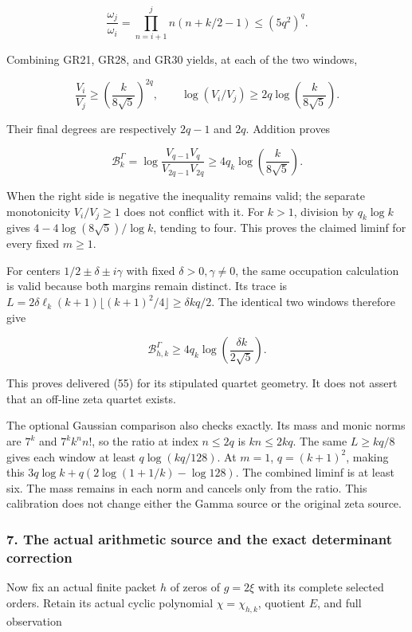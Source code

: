 \[
\frac{\omega_j}{\omega_i}
=\prod_{n=i+1}^{j}n(n+k/2-1)\le(5q^2)^q.
\tag{GR30}
\]

Combining GR21, GR28, and GR30 yields, at each of the two windows,

\[
\frac{V_i}{V_j}\ge\left(\frac{k}{8\sqrt5}\right)^{2q},
\qquad
\log(V_i/V_j)\ge2q\log\left(\frac{k}{8\sqrt5}\right).
\tag{GR31}
\]

Their final degrees are respectively \(2q-1\) and \(2q\). Addition proves

\[
\boxed{\mathcal B_k^\Gamma
=\log\frac{V_{q-1}V_q}{V_{2q-1}V_{2q}}
\ge4q_k\log\left(\frac{k}{8\sqrt5}\right).}
\tag{GR32}
\]

When the right side is negative the inequality remains valid; the separate monotonicity \(V_i/V_j\ge1\) does not conflict with it. For \(k>1\), division by \(q_k\log k\) gives \(4-4\log(8\sqrt5)/\log k\), tending to four. This proves the claimed liminf for every fixed \(m\ge1\).

For centers \(1/2\pm\delta\pm i\gamma\) with fixed \(\delta>0,\gamma\ne0\), the same occupation calculation is valid because both margins remain distinct. Its trace is \(L=2\delta\ell_k(k+1)\lfloor(k+1)^2/4\rfloor\ge\delta kq/2\). The identical two windows therefore give

\[
\mathcal B_{h,k}^{\Gamma}\ge4q_k\log\left(\frac{\delta k}{2\sqrt5}\right).
\tag{GR33}
\]

This proves delivered (55) for its stipulated quartet geometry. It does not assert that an off-line zeta quartet exists.

The optional Gaussian comparison also checks exactly. Its mass and monic norms are \(7^k\) and \(7^kk^nn!\), so the ratio at index \(n\le2q\) is \(kn\le2kq\). The same \(L\ge kq/8\) gives each window at least \(q\log(kq/128)\). At \(m=1\), \(q=(k+1)^2\), making this \(3q\log k+q(2\log(1+1/k)-\log128)\). The combined liminf is at least six. The mass remains in each norm and cancels only from the ratio. This calibration does not change either the Gamma source or the original zeta source.

\subsubsection{7. The actual arithmetic source and the exact determinant correction}\label{endpoint-gamma_review--the-actual-arithmetic-source-and-the-exact-determinant-correction}

Now fix an actual finite packet \(h\) of zeros of \(g=2\xi\) with its complete selected orders. Retain its actual cyclic polynomial \(\chi=\chi_{h,k}\), quotient \(E\), and full observation


